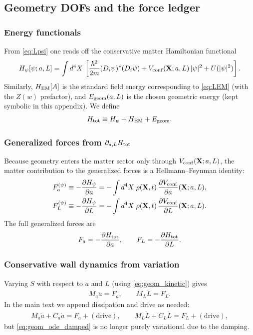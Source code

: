\documentclass[11pt]{article}
\begin{document}
\subsection{Geometry DOFs and the force ledger}
\subsubsection{Energy functionals}
From \eqref{eq:Lpsi} one reads off the conservative matter Hamiltonian functional
\begin{align}
H_\psi[\psi;a,L]
=
\int d^4X\,
\left[
\frac{\hbar^2}{2m}(D_i\psi)^\ast(D_i\psi)
+V_{\rm conf}(\mathbf{X};a,L)\,|\psi|^2
+U(|\psi|^2)
\right].
\label{eq:Hpsi}
\end{align}
Similarly, $H_{\rm EM}[A]$ is the standard field energy corresponding to
\eqref{eq:LEM} (with the $Z(w)$ prefactor), and $E_{\rm geom}(a,L)$ is the chosen
geometric energy (kept symbolic in this appendix).  We define
\begin{align}
H_{\rm tot} \equiv H_\psi + H_{\rm EM} + E_{\rm geom}.
\end{align}

\subsubsection{Generalized forces from $\partial_{a,L}H_{\rm tot}$}
Because geometry enters the matter sector only through $V_{\rm conf}(\mathbf{X};a,L)$,
the matter contribution to the generalized forces is a Hellmann--Feynman identity:
\begin{align}
F_a^{(\psi)} \equiv -\frac{\partial H_\psi}{\partial a}
=
-\int d^4X\;\rho(\mathbf{X},t)\,\frac{\partial V_{\rm conf}}{\partial a}(\mathbf{X};a,L),
\label{eq:Fa_HF}
\\
F_L^{(\psi)} \equiv -\frac{\partial H_\psi}{\partial L}
=
-\int d^4X\;\rho(\mathbf{X},t)\,\frac{\partial V_{\rm conf}}{\partial L}(\mathbf{X};a,L).
\label{eq:FL_HF}
\end{align}
The full generalized forces are
\begin{align}
F_a = -\frac{\partial H_{\rm tot}}{\partial a},
\qquad
F_L = -\frac{\partial H_{\rm tot}}{\partial L}.
\label{eq:geom_forces}
\end{align}

\subsubsection{Conservative wall dynamics from variation}
Varying $S$ with respect to $a$ and $L$ (using \eqref{eq:geom_kinetic}) gives
\begin{align}
M_a \ddot a = F_a,
\qquad
M_L \ddot L = F_L.
\label{eq:geom_ode_conservative}
\end{align}
In the main text we append dissipation and drive as needed:
\begin{align}
M_a \ddot a + C_a \dot a = F_a + (\text{drive}),
\qquad
M_L \ddot L + C_L \dot L = F_L + (\text{drive}),
\label{eq:geom_ode_damped}
\end{align}
but \eqref{eq:geom_ode_damped} is no longer purely variational due to the damping.
\end{document}
